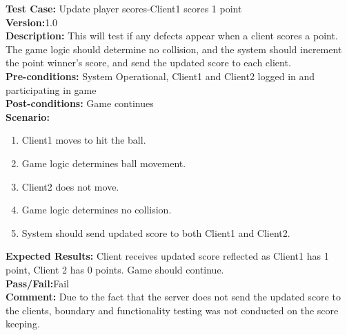 \noindent \textbf{Test Case:} Update player scores-Client1 scores 1 point\\
\textbf{Version:}1.0\\
\textbf{Description:} This will test if any defects appear when a client scores a point.  The game logic should determine no collision, and the system should increment the point winner's score, and send the updated score to each client.\\
\textbf{Pre-conditions:} System Operational, Client1 and Client2 logged in and participating in game \\
\textbf{Post-conditions:} Game continues\\
\textbf{Scenario:}
\begin{enumerate}
\item Client1 moves to hit the ball.\\
\item Game logic determines ball movement.\\
\item Client2 does not move.\\
\item Game logic determines no collision. \\
\item System should send updated score to both Client1 and Client2.\\
\end{enumerate}
\textbf{Expected Results:} Client receives updated score reflected as Client1 has 1 point, Client 2 has 0 points.  Game should continue.\\
\textbf{Pass/Fail:}Fail\\
\textbf{Comment:} Due to the fact that the server does not send the updated score to the clients, boundary and functionality testing was not conducted on the score keeping.\\

